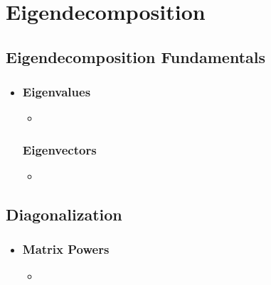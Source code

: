 \chapter{Eigendecomposition}\label{Eigendecomposition}

\section{Eigendecomposition Fundamentals}\label{Eigendecomposition Fundamentals}
\begin{itemize}
  \item []
  
  \subsection{Eigenvalues}\label{Eigenvalues}
  \begin{itemize}
    \item 
  \end{itemize}
  

  \subsection{Eigenvectors}\label{Eigenvectors}
  \begin{itemize}
    \item 
  \end{itemize}
  
\end{itemize}


\section{Diagonalization}\label{Diagonalization}
\begin{itemize}
  \item []
  
  \subsection{Matrix Powers}\label{Matrix Powers}
  \begin{itemize}
    \item 
  \end{itemize}
  
\end{itemize}

